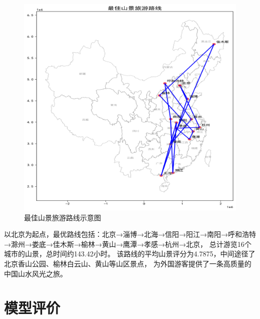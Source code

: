 \documentclass[withoutpreface,bwprint]{cumcmthesis} %
\begin{document}
\begin{figure}[H]
    \centering
    \includegraphics[width=1.0\textwidth]{figures/image/5.2_mountain_route.png}
    \caption{最佳山景旅游路线示意图}
    \label{fig:最佳山景旅游路线示意图}
\end{figure}

以北京为起点，最优路线包括：北京→淄博→北海→信阳→阳江→南阳→呼和浩特→滁州→娄底→佳木斯→榆林→黄山→鹰潭→孝感→杭州→北京，
总计游览16个城市的山景，总时间约143.42小时。
该路线的平均山景评分为4.7875，中间途径了北京香山公园、榆林白云山、黄山等山区景点，
为外国游客提供了一条高质量的中国山水风光之旅。






\section{模型评价}
\end{document}

